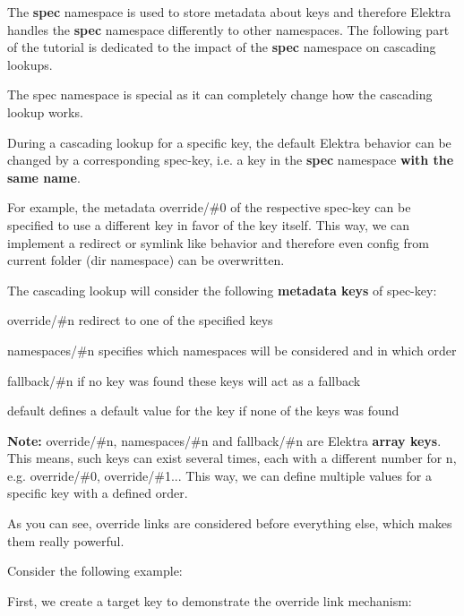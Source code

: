 The {\bfseries spec} namespace is used to store metadata about keys and therefore Elektra handles the {\bfseries spec} namespace differently to other namespaces. The following part of the tutorial is dedicated to the impact of the {\bfseries spec} namespace on cascading lookups.

The {\ttfamily spec} namespace is special as it can completely change how the cascading lookup works.

During a cascading lookup for a specific key, the default Elektra behavior can be changed by a corresponding {\ttfamily spec-\/key}, i.\+e. a key in the {\bfseries spec} namespace {\bfseries with the same name}.

For example, the metadata {\ttfamily override/\#0} of the respective {\ttfamily spec-\/key} can be specified to use a different key in favor of the key itself. This way, we can implement a redirect or symlink like behavior and therefore even config from current folder ({\ttfamily dir} namespace) can be overwritten.

The cascading lookup will consider the following {\bfseries metadata keys} of {\ttfamily spec-\/key}\+:


\begin{DoxyEnumerate}
\item {\ttfamily override/\#n} redirect to one of the specified keys
\item {\ttfamily namespaces/\#n} specifies which namespaces will be considered and in which order
\item {\ttfamily fallback/\#n} if no key was found these keys will act as a fallback
\item {\ttfamily default} defines a default value for the key if none of the keys was found
\end{DoxyEnumerate}

{\bfseries Note\+:} {\ttfamily override/\#n}, {\ttfamily namespaces/\#n} and {\ttfamily fallback/\#n} are Elektra {\bfseries array keys}. This means, such keys can exist several times, each with a different number for {\ttfamily n}, e.\+g. {\ttfamily override/\#0}, {\ttfamily override/\#1}... This way, we can define multiple values for a specific key with a defined order.

As you can see, override links are considered before everything else, which makes them really powerful.

Consider the following example\+:

First, we create a target key to demonstrate the override link mechanism\+:


